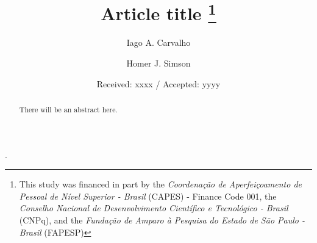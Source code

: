 \documentclass{svjour3}                      %
\begin{document}
\title{Article title \thanks{This study was financed in part by the \emph{Coordenação de Aperfeiçoamento de Pessoal de Nível Superior - Brasil} (CAPES) - Finance Code 001, the \emph{Conselho Nacional de Desenvolvimento Científico e Tecnológico - Brasil} (CNPq), and the \emph{Fundação de Amparo à Pesquisa do Estado de São Paulo - Brasil} (FAPESP)}}.


\author{Iago A. Carvalho \and Homer J. Simson}



\date{Received: xxxx / Accepted: yyyy}

\maketitle

\begin{abstract}
There will be an abstract here.
\end{abstract}



\end{document}
